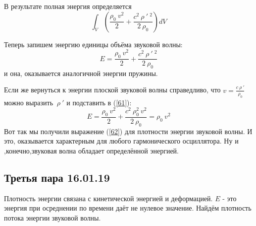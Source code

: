 \documentclass[14pt,a4paper,oneside]{extarticle}	%
\newcommand{\bracket}[1] {\left( #1 \right) } %
\begin{document}
В результате полная энергия определяется 
\begin{equation*}
\int_{V}\bracket{\frac{\rho_{0} \: v^{2}}{2} + \frac{c^{2}\:\rho\:'\:^{2}}{2\:\rho_{0}}}dV
\end{equation*}

Теперь запишем энергию единицы объёма звуковой волны:
\begin{equation}\label{61}
E = \frac{\rho_{0} \: v^{2}}{2} + \frac{c^{2}\:\rho\:'\:^{2}}{2\:\rho_{0}}
\end{equation}
и она, оказывается аналогичной энергии пружины.

Если же вернуться к энергии плоской звуковой волны справедливо, что $ v = \frac{c\:\rho\:'}{\rho_{0}} $ можно выразить $ \:\rho\:' $ и подставить в (\ref{61}):
\begin{equation}\label{62}
E = \frac{\rho_{0} \: v^{2}}{2} + \frac{c^{2}\:\rho_{0}^{2}\:v^{2}}{2\:\rho_{0}} = \rho_{0}\:v^{2}
\end{equation}
Вот так мы получили выражение (\ref{62}) для плотности энергии звуковой волны.
И это, оказывается характерным для любого гармонического осциллятора. Ну и ,конечно,звуковая волна обладает определённой энергией.
\newpage
\begin{center}
	\section*{Третья пара 16.01.19} %
\end{center}
Плотность энергии связана с кинетической энергией и деформацией.
$ E $ - это энергия при осреднении по времени даёт не нулевое значение.
Найдём плотность потока энергии звуковой волны. 
\end{document}
